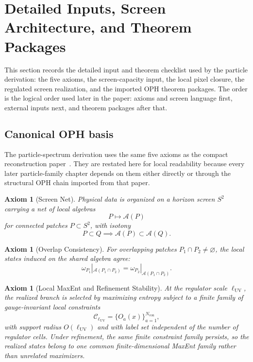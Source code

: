 \documentclass[11pt]{article}
\newtheorem{axiom}[theorem]{Axiom}
\begin{document}
\section{Detailed Inputs, Screen Architecture, and Theorem Packages}\label{sec:particle-input-ledger}

This section records the detailed input and theorem checklist used by the particle derivation: the five axioms,
the screen-capacity input, the local pixel closure, the regulated screen realization, and the imported
OPH theorem packages. The order is the logical order used later in the paper: axioms and screen
language first, external inputs next, and theorem packages after that.

\subsection{Canonical OPH basis}

The particle-spectrum derivation uses the same five axioms as the compact reconstruction
paper~\cite{ophcompact}. They are restated here for local readability because every later
particle-family chapter depends on them either directly or through the structural OPH chain
imported from that paper.

\begin{axiom}[Screen Net]\label{ax:screen}
Physical data is organized on a horizon screen \(S^2\) carrying a net of local algebras
\[
P \longmapsto \mathcal A(P)
\]
for connected patches \(P\subset S^2\), with isotony
\[
P\subset Q \implies \mathcal A(P)\subset \mathcal A(Q).
\]
\end{axiom}

\begin{axiom}[Overlap Consistency]\label{ax:overlap}
For overlapping patches \(P_1\cap P_2\neq\varnothing\), the local states induced on the shared
algebra agree:
\[
\omega_{P_1}|_{\mathcal A(P_1\cap P_2)}
=
\omega_{P_2}|_{\mathcal A(P_1\cap P_2)}.
\]
\end{axiom}

\begin{axiom}[Local MaxEnt and Refinement Stability]\label{ax:maxent}
At the regulator scale \(\ell_{\mathrm{UV}}\), the realized branch is selected by maximizing
entropy subject to a finite family of gauge-invariant local constraints
\[
\mathcal C_{\ell_{\mathrm{UV}}}=\{O_a(x)\}_{a=1}^{N_{\mathrm{con}}},
\]
with support radius \(O(\ell_{\mathrm{UV}})\) and with label set independent of the number of
regulator cells. Under refinement, the same finite constraint family persists, so the realized
states belong to one common finite-dimensional MaxEnt family rather than unrelated maximizers.
\end{axiom}
\end{document}
